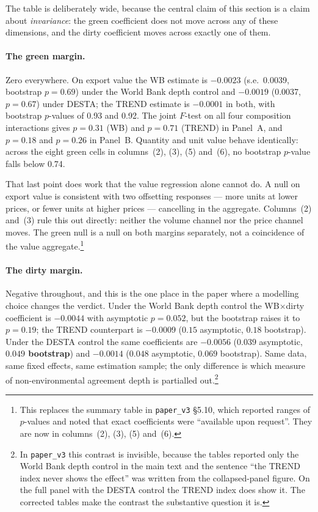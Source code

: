 \documentclass[11pt]{article}
\begin{document}
The table is deliberately wide, because the central claim of this section is a claim about
\emph{invariance}: the green coefficient does not move across any of these dimensions, and the
dirty coefficient moves across exactly one of them.

\paragraph{The green margin.} Zero everywhere. On export value the WB estimate is $-0.0023$
(s.e.\ 0.0039, bootstrap $p = 0.69$) under the World Bank depth control and $-0.0019$
(0.0037, $p = 0.67$) under DESTA; the TREND estimate is $-0.0001$ in both, with bootstrap
$p$-values of 0.93 and 0.92. The joint $F$-test on all four composition interactions gives
$p = 0.31$ (WB) and $p = 0.71$ (TREND) in Panel~A, and $p = 0.18$ and $p = 0.26$ in Panel~B.
Quantity and unit value behave identically: across the eight green cells in columns~(2), (3),
(5) and~(6), no bootstrap $p$-value falls below 0.74.

That last point does work that the value regression alone cannot do. A null on export value is
consistent with two offsetting responses --- more units at lower prices, or fewer units at higher
prices --- cancelling in the aggregate. Columns~(2) and~(3) rule this out directly: neither the
volume channel nor the price channel moves. The green null is a null on both margins separately,
not a coincidence of the value aggregate.\footnote{This replaces the summary table in
\texttt{paper\_v3} \S5.10, which reported ranges of $p$-values and noted that exact coefficients
were ``available upon request''. They are now in columns~(2), (3), (5) and~(6).}

\paragraph{The dirty margin.} Negative throughout, and this is the one place in the paper where a
modelling choice changes the verdict. Under the World Bank depth control the WB$\times$dirty
coefficient is $-0.0044$ with asymptotic $p = 0.052$, but the bootstrap raises it to $p = 0.19$;
the TREND counterpart is $-0.0009$ ($0.15$ asymptotic, $0.18$ bootstrap). Under the DESTA control
the same coefficients are $-0.0056$ ($0.039$ asymptotic, \textbf{$0.049$ bootstrap}) and $-0.0014$
($0.048$ asymptotic, $0.069$ bootstrap). Same data, same fixed effects, same estimation sample; the
only difference is which measure of non-environmental agreement depth is partialled out.\footnote{%
In \texttt{paper\_v3} this contrast is invisible, because the tables reported only the World Bank
depth control in the main text and the sentence ``the TREND index never shows the effect'' was
written from the collapsed-panel figure. On the full panel with the DESTA control the TREND index
does show it. The corrected tables make the contrast the substantive question it is.}
\end{document}
